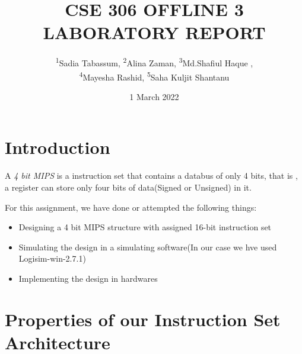 \documentclass[12pt]{article}
\title{CSE 306 OFFLINE 3 LABORATORY REPORT}
\author{\textsuperscript{1}Sadia Tabassum, \textsuperscript{2}Alina Zaman, \textsuperscript{3}Md.Shafiul Haque ,\\\textsuperscript{4}Mayesha Rashid, \textsuperscript{5}Saha Kuljit Shantanu}
\date{1 March 2022}
\begin{document}
\maketitle

\section{Introduction}

A \textit{4 bit MIPS} is a instruction set that contains a databus of only 4 bits, that is , a register can store only four bits of data(Signed or Unsigned) in it.

For this assignment, we have done or attempted the following things:
\begin{itemize}
    \item Designing a 4 bit MIPS structure with assigned 16-bit instruction set
    \item Simulating the design in a simulating software(In our case we hve used Logisim-win-2.7.1)
    \item Implementing the design in hardwares
\end{itemize}

\section{Properties of our Instruction Set Architecture}
\end{document}
